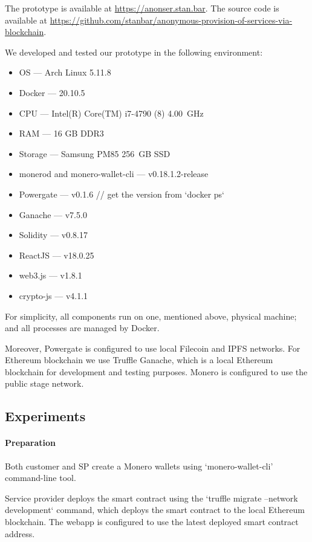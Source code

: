 \documentclass{ieeeaccess}
\begin{document}
The prototype is available at \url{https://anonser.stan.bar}. The source code is available at \url{https://github.com/stanbar/anonymous-provision-of-services-via-blockchain}.

We developed and tested our prototype in the following environment:

\begin{itemize}
  \item{OS} — Arch Linux 5.11.8
  \item{Docker} — 20.10.5
  \item{CPU} — Intel(R) Core(TM) i7-4790 (8) 4.00~GHz
  \item{RAM} — 16 GB DDR3
  \item{Storage} — Samsung PM85 256~GB SSD

  \item{monerod and monero-wallet-cli} — v0.18.1.2-release
  \item{Powergate} — v0.1.6 // get the version from `docker ps`
  \item{Ganache} — v7.5.0
  \item{Solidity} — v0.8.17
  \item{ReactJS} — v18.0.25
  \item{web3.js} — v1.8.1
  \item{crypto-js} — v4.1.1
\end{itemize}

For simplicity, all components run on one, mentioned above, physical machine; and all processes are managed by Docker. 

Moreover, Powergate is configured to use local Filecoin and IPFS networks.
For Ethereum blockchain we use Truffle Ganache, which is a local Ethereum blockchain for development and testing purposes. 
Monero is configured to use the public stage network.

\subsection*{Experiments}

\paragraph{Preparation}

Both customer and SP create a Monero wallets using `monero-wallet-cli' command-line tool.

Service provider deploys the smart contract using the `truffle migrate --network development` command, which deploys the smart contract to the local Ethereum blockchain. The webapp is configured to use the latest deployed smart contract address.
\end{document}
